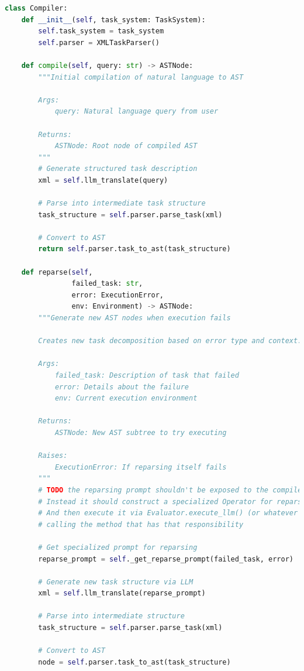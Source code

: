 \documentclass{article}
\begin{document}
\begin{lstlisting}[language=Python]
class Compiler:
    def __init__(self, task_system: TaskSystem):
        self.task_system = task_system
        self.parser = XMLTaskParser()

    def compile(self, query: str) -> ASTNode:
        """Initial compilation of natural language to AST
        
        Args:
            query: Natural language query from user
            
        Returns:
            ASTNode: Root node of compiled AST
        """
        # Generate structured task description
        xml = self.llm_translate(query)
        
        # Parse into intermediate task structure
        task_structure = self.parser.parse_task(xml)
        
        # Convert to AST
        return self.parser.task_to_ast(task_structure)

    def reparse(self, 
                failed_task: str,
                error: ExecutionError,
                env: Environment) -> ASTNode:
        """Generate new AST nodes when execution fails
        
        Creates new task decomposition based on error type and context.
        
        Args:
            failed_task: Description of task that failed
            error: Details about the failure
            env: Current execution environment
            
        Returns:
            ASTNode: New AST subtree to try executing
            
        Raises:
            ExecutionError: If reparsing itself fails
        """
        # TODO the reparsing prompt shouldn't be exposed to the compiler. 
        # Instead it should construct a specialized Operator for reparsing 
        # And then execute it via Evaluator.execute_llm() (or whatever we're 
        # calling the method that has that responsibility

        # Get specialized prompt for reparsing
        reparse_prompt = self._get_reparse_prompt(failed_task, error)
        
        # Generate new task structure via LLM
        xml = self.llm_translate(reparse_prompt)
        
        # Parse into intermediate structure
        task_structure = self.parser.parse_task(xml)
        
        # Convert to AST
        node = self.parser.task_to_ast(task_structure)
        

\end{lstlisting}
\end{document}
